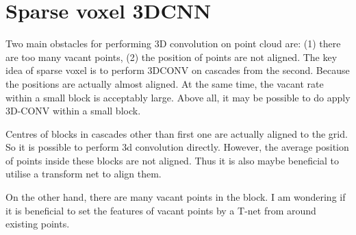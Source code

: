 \documentclass[,table,dvipsnames]{article}
\begin{document}
\section{Sparse voxel 3DCNN }
\par \par
Two main obstacles for performing 3D convolution on point cloud are: (1) there are too many vacant points, (2) the position of points are not aligned.
The key idea of sparse voxel is to perform 3DCONV on cascades from the second. Because the positions are actually almost aligned. At the same time, the vacant rate within a small block is acceptably large. Above all, it may be possible to do apply 3D-CONV within a small block. 
\par
Centres of blocks in cascades other than first one are actually aligned to the grid. So it is possible to perform 3d convolution directly. However, the average position of points inside these blocks are not aligned. Thus it is also maybe beneficial to utilise a transform net to align them.\par
On the other hand, there are many vacant points in the block. I am wondering if it is beneficial to set the features of vacant points by a T-net from around existing points.
\par
\end{document}

